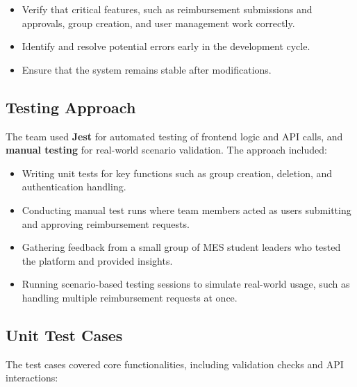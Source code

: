 \documentclass[12pt, titlepage]{article}
\begin{document}
\begin{itemize}
    \item Verify that critical features, such as reimbursement submissions and approvals, group creation, and user management work correctly.
    \item Identify and resolve potential errors early in the development cycle.
    \item Ensure that the system remains stable after modifications.
\end{itemize}

\subsection{Testing Approach}
The team used \textbf{Jest} for automated testing of frontend logic and API calls, and \textbf{manual testing} for real-world scenario validation. The approach included:

\begin{itemize}
    \item Writing unit tests for key functions such as group creation, deletion, and authentication handling.
    \item Conducting manual test runs where team members acted as users submitting and approving reimbursement requests.
    \item Gathering feedback from a small group of MES student leaders who tested the platform and provided insights.
    \item Running scenario-based testing sessions to simulate real-world usage, such as handling multiple reimbursement requests at once.
\end{itemize}

\subsection{Unit Test Cases}
The test cases covered core functionalities, including validation checks and API interactions:
\end{document}
